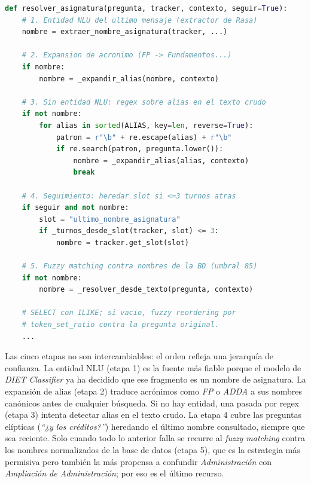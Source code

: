 \begin{lstlisting}[language=python, basicstyle=\ttfamily\footnotesize, caption={Cascada de resolucion de \texttt{resolver\_asignatura()}.}, label={lst:asig-cascada}]
def resolver_asignatura(pregunta, tracker, contexto, seguir=True):
    # 1. Entidad NLU del ultimo mensaje (extractor de Rasa)
    nombre = extraer_nombre_asignatura(tracker, ...)

    # 2. Expansion de acronimo (FP -> Fundamentos...)
    if nombre:
        nombre = _expandir_alias(nombre, contexto)

    # 3. Sin entidad NLU: regex sobre alias en el texto crudo
    if not nombre:
        for alias in sorted(ALIAS, key=len, reverse=True):
            patron = r"\b" + re.escape(alias) + r"\b"
            if re.search(patron, pregunta.lower()):
                nombre = _expandir_alias(alias, contexto)
                break

    # 4. Seguimiento: heredar slot si <=3 turnos atras
    if seguir and not nombre:
        slot = "ultimo_nombre_asignatura"
        if _turnos_desde_slot(tracker, slot) <= 3:
            nombre = tracker.get_slot(slot)

    # 5. Fuzzy matching contra nombres de la BD (umbral 85)
    if not nombre:
        nombre = _resolver_desde_texto(pregunta, contexto)

    # SELECT con ILIKE; si vacio, fuzzy reordering por
    # token_set_ratio contra la pregunta original.
    ...
\end{lstlisting}

Las cinco etapas no son intercambiables: el orden refleja una jerarquía de confianza. La entidad NLU (etapa 1) es la fuente más fiable porque el modelo de \textit{DIET Classifier} ya ha decidido que ese fragmento es un nombre de asignatura. La expansión de alias (etapa 2) traduce acrónimos como \textit{FP} o \textit{ADDA} a sus nombres canónicos antes de cualquier búsqueda. Si no hay entidad, una pasada por regex (etapa 3) intenta detectar alias en el texto crudo. La etapa 4 cubre las preguntas elípticas (\textit{``¿y los créditos?''}) heredando el último nombre consultado, siempre que sea reciente. Solo cuando todo lo anterior falla se recurre al \textit{fuzzy matching} contra los nombres normalizados de la base de datos (etapa 5), que es la estrategia más permisiva pero también la más propensa a confundir \textit{Administración} con \textit{Ampliación de Administración}; por eso es el último recurso.

